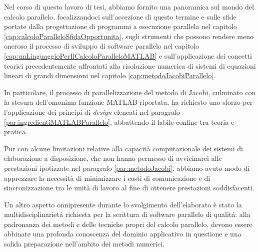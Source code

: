 Nel corso di questo lavoro di tesi, abbiamo fornito una panoramica sul mondo del calcolo parallelo, focalizzandoci sull'accezione di questo termine e sulle sfide portate dalla progettazione di programmi a esecuzione parallela nel capitolo \ref{cap:calcoloParalleloSfidaOpportunita}, sugli strumenti che possono rendere meno oneroso il processo di sviluppo di software parallelo
nel capitolo \ref{cap:unLinguaggioPerIlCalcoloParalleloMATLAB} e sull'applicazione dei concetti teorici precedentemente affrontati alla risoluzione numerica di sistemi di equazioni lineari di grandi dimensioni nel capitolo \ref{cap:metodoJacobiParallelo}.

In particolare, il processo di parallelizzazione del metodo di Jacobi, culminato con la stesura dell'omonima funzione 
MATLAB riportata, ha richiesto uno sforzo per l'applicazione dei principi di \textit{design} elencati nel paragrafo \ref{par:ingredientiMATLABParallelo}, abbattendo il labile confine tra teoria e pratica.

Pur con alcune limitazioni relative alla capacit\`a computazionale dei sistemi di elaborazione a disposizione, che non hanno 
permesso di avvicinarci alle prestazioni ipotizzate nel paragrafo \ref{par:metodoJacobi}, 
abbiamo avuto modo di apprezzare la necessit\`a di minimizzare i costi di comunicazione e di sincronizzazione tra le unit\`a di lavoro 
al fine di ottenere prestazioni soddisfacenti.%

Un altro aspetto onnipresente durante lo svolgimento dell'elaborato \`e stato la multidisciplinariet\'a richiesta per la scrittura 
di software parallelo di qualit\'a: alla padronanza dei metodi e delle tecniche propri del calcolo parallelo, devono essere 
abbinate una profonda conoscenza del dominio applicativo in questione e una solida preparazione nell'ambito dei metodi numerici.